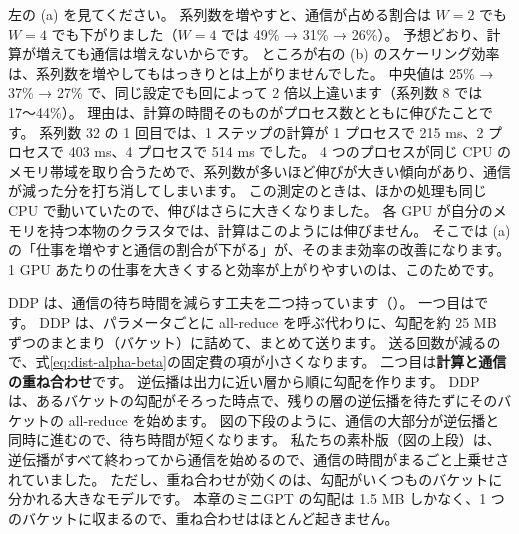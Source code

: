 左の (a) を見てください。
系列数を増やすと、通信が占める割合は $W=2$ でも $W=4$ でも下がりました（$W=4$ では 49\% → 31\% → 26\%）。
予想どおり、計算が増えても通信は増えないからです。
ところが右の (b) のスケーリング効率は、系列数を増やしてもはっきりとは上がりませんでした。
中央値は 25\% → 37\% → 27\% で、同じ設定でも回によって 2 倍以上違います（系列数 8 では 17〜44\%）。
理由は、計算の時間そのものがプロセス数とともに伸びたことです。
系列数 32 の 1 回目では、1 ステップの計算が 1 プロセスで 215 ms、2 プロセスで 403 ms、4 プロセスで 514 ms でした。
4 つのプロセスが同じ CPU のメモリ帯域を取り合うためで、系列数が多いほど伸びが大きい傾向があり、通信が減った分を打ち消してしまいます。
この測定のときは、ほかの処理も同じ CPU で動いていたので、伸びはさらに大きくなりました。
各 GPU が自分のメモリを持つ本物のクラスタでは、計算はこのようには伸びません。
そこでは (a) の「仕事を増やすと通信の割合が下がる」が、そのまま効率の改善になります。
1 GPU あたりの仕事を大きくすると効率が上がりやすいのは、このためです。

DDP は、通信の待ち時間を減らす工夫を二つ持っています（）\cite{li2020pytorch}。
一つ目はです。
DDP は、パラメータごとに all-reduce を呼ぶ代わりに、勾配を約 25 MB ずつのまとまり（バケット）に詰めて、まとめて送ります。
送る回数が減るので、式\eqref{eq:dist-alpha-beta}の固定費の項が小さくなります。
二つ目は\textbf{計算と通信の重ね合わせ}です。
逆伝播は出力に近い層から順に勾配を作ります。
DDP は、あるバケットの勾配がそろった時点で、残りの層の逆伝播を待たずにそのバケットの all-reduce を始めます。
図の下段のように、通信の大部分が逆伝播と同時に進むので、待ち時間が短くなります。
私たちの素朴版（図の上段）は、逆伝播がすべて終わってから通信を始めるので、通信の時間がまるごと上乗せされていました。
ただし、重ね合わせが効くのは、勾配がいくつものバケットに分かれる大きなモデルです。
本章のミニGPT の勾配は 1.5 MB しかなく、1 つのバケットに収まるので、重ね合わせはほとんど起きません。

